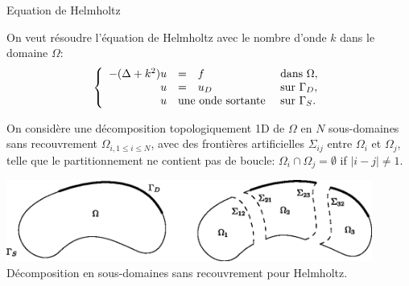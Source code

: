 \documentclass[
mode=present,    %
paper=a4paper,   %
orient=landscape,
display=slides,   %
size=10pt,
style=romain   %
]{powerdot}
\begin{document}
\begin{slide}[toc=]{Equation de Helmholtz}

On veut résoudre l'équation de Helmholtz avec le nombre d'onde $k$ dans
le domaine $\Omega$:
\begin{equation}
\left\{\begin{array}{rcll}
-(\Delta + k^2) u & = & f & \text{ dans } \Omega,\\
u & = & u_D & \text{ sur } \Gamma_D,\\
u & \multicolumn{2}{l}{\text{une onde sortante}} & \text{ sur } \Gamma_S.\\
\end{array}\right.
\label{eq:Helmholtz}
\end{equation}

On considère une décomposition topologiquement 1D de $\Omega$ en $N$
sous-domaines sans recouvrement $\Omega_{i, 1 \leq i \leq N}$, avec des
frontières artificielles $\Sigma_{ij}$ entre $\Omega_i$ et $\Omega_{j}$,
telle que le partitionnement ne contient pas de boucle: $\Omega_i \cap
\Omega_j = \emptyset$ if $|i-j|\neq 1$.

\begin{center}
 \includegraphics[width=0.9\textwidth]{hdom.eps}\\[1em]
 Décomposition en sous-domaines sans recouvrement pour Helmholtz.
\end{center}

\end{slide}
\end{document}
